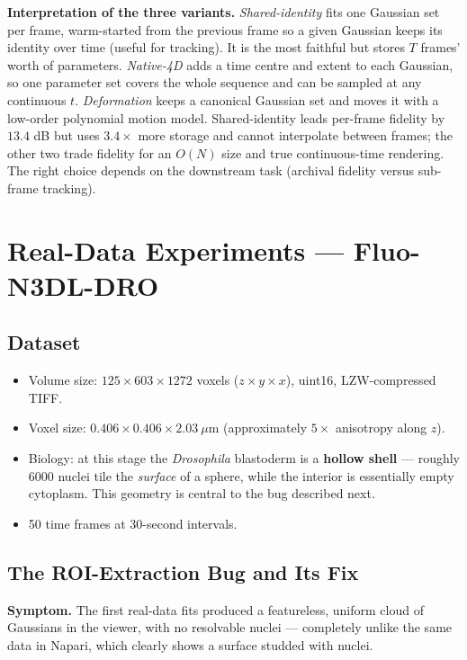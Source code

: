 \documentclass[11pt,a4paper]{article}
\begin{document}
\textbf{Interpretation of the three variants.}
\emph{Shared-identity} fits one Gaussian set per frame, warm-started from the previous
frame so a given Gaussian keeps its identity over time (useful for tracking). It is the
most faithful but stores \(T\) frames' worth of parameters. \emph{Native-4D} adds a time
centre and extent to each Gaussian, so one parameter set covers the whole sequence and
can be sampled at any continuous \(t\). \emph{Deformation} keeps a canonical Gaussian set
and moves it with a low-order polynomial motion model. Shared-identity leads per-frame
fidelity by \(13.4\) dB but uses \(3.4\times\) more storage and cannot interpolate
between frames; the other two trade fidelity for an \(O(N)\) size and true continuous-time
rendering. The right choice depends on the downstream task (archival fidelity versus
sub-frame tracking).

\section{Real-Data Experiments --- Fluo-N3DL-DRO}
\label{sec:realdata}

\subsection{Dataset}

\begin{itemize}
    \item Volume size: \(125 \times 603 \times 1272\) voxels (\(z \times y \times x\)),
    uint16, LZW-compressed TIFF.
    \item Voxel size: \(0.406 \times 0.406 \times 2.03~\mu\mathrm{m}\) (approximately
    \(5\times\) anisotropy along \(z\)).
    \item Biology: at this stage the \emph{Drosophila} blastoderm is a \textbf{hollow
    shell} --- roughly \(6000\) nuclei tile the \emph{surface} of a sphere, while the
    interior is essentially empty cytoplasm. This geometry is central to the bug described
    next.
    \item 50 time frames at 30-second intervals.
\end{itemize}

\subsection{The ROI-Extraction Bug and Its Fix}
\label{sec:roi-bug}

\textbf{Symptom.}
The first real-data fits produced a featureless, uniform cloud of Gaussians in the
viewer, with no resolvable nuclei --- completely unlike the same data in Napari, which
clearly shows a surface studded with nuclei.
\end{document}
